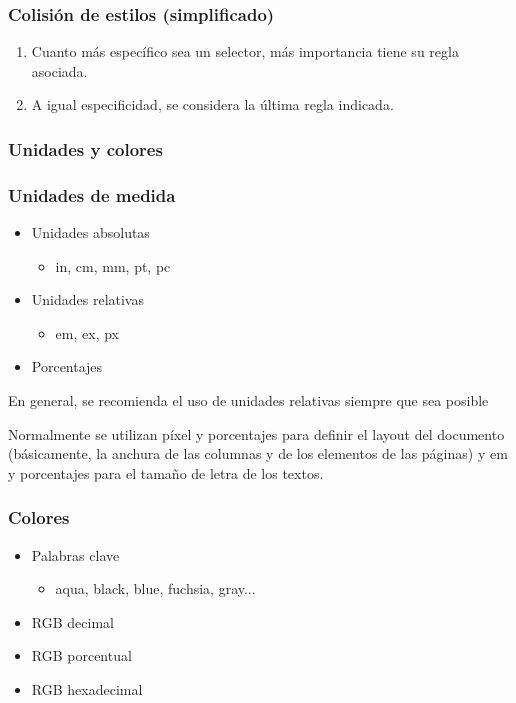 
\begin{frame}
\frametitle{Colisión de estilos (simplificado)}

\begin{enumerate}
  \item Cuanto más específico sea un selector, más importancia tiene su regla asociada.
  \item A igual especificidad, se considera la última regla indicada.
\end{enumerate}

\end{frame}




\subsubsection*{Unidades y colores}

\begin{frame}
\frametitle{Unidades de medida}

\begin{itemize}
  \item Unidades absolutas
  \begin{itemize}
    \item in, cm, mm, pt, pc
  \end{itemize}
  \item Unidades relativas
  \begin{itemize}
    \item em, ex, px
  \end{itemize}
  \item Porcentajes
\end{itemize}

En general, se recomienda el uso de unidades relativas siempre que sea posible

Normalmente se utilizan píxel y porcentajes para definir el layout del documento (básicamente, la anchura de las columnas y de los elementos de las páginas) y em y porcentajes para el tamaño de letra de los textos.

\end{frame}


\begin{frame}
\frametitle{Colores}

\begin{itemize}
  \item Palabras clave
  \begin{itemize}
    \item aqua, black, blue, fuchsia, gray...
  \end{itemize}
  \item RGB decimal
  \item RGB porcentual
  \item RGB hexadecimal
\end{itemize}

\end{frame}


